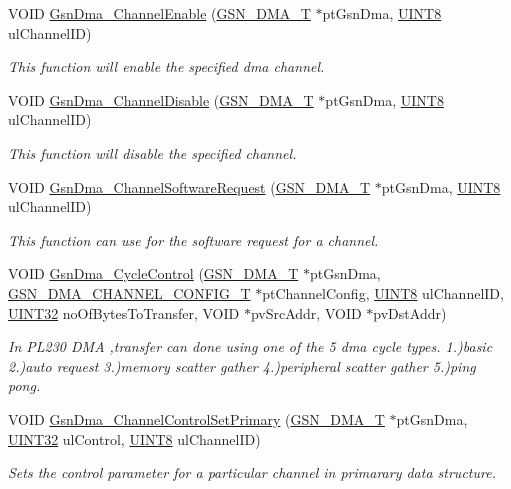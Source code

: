 \begin{DoxyCompactItemize}
VOID \hyperlink{a00645_gafe8f53f9d44f015348fa1dc566a535a9}{GsnDma\_\-ChannelEnable} (\hyperlink{a00049}{GSN\_\-DMA\_\-T} $\ast$ptGsnDma, \hyperlink{a00660_gab27e9918b538ce9d8ca692479b375b6a}{UINT8} ulChannelID)
\begin{DoxyCompactList}\small\item\em This function will enable the specified dma channel. \end{DoxyCompactList}\item 
VOID \hyperlink{a00645_gae368b9082da7ffdcf71880d0ee0d5322}{GsnDma\_\-ChannelDisable} (\hyperlink{a00049}{GSN\_\-DMA\_\-T} $\ast$ptGsnDma, \hyperlink{a00660_gab27e9918b538ce9d8ca692479b375b6a}{UINT8} ulChannelID)
\begin{DoxyCompactList}\small\item\em This function will disable the specified channel. \end{DoxyCompactList}\item 
VOID \hyperlink{a00645_ga4b168b176e39643a79d1e17a35509ddd}{GsnDma\_\-ChannelSoftwareRequest} (\hyperlink{a00049}{GSN\_\-DMA\_\-T} $\ast$ptGsnDma, \hyperlink{a00660_gab27e9918b538ce9d8ca692479b375b6a}{UINT8} ulChannelID)
\begin{DoxyCompactList}\small\item\em This function can use for the software request for a channel. \end{DoxyCompactList}\item 
VOID \hyperlink{a00645_ga508b5fe55e9c637738cf2661a571363c}{GsnDma\_\-CycleControl} (\hyperlink{a00049}{GSN\_\-DMA\_\-T} $\ast$ptGsnDma, \hyperlink{a00052}{GSN\_\-DMA\_\-CHANNEL\_\-CONFIG\_\-T} $\ast$ptChannelConfig, \hyperlink{a00660_gab27e9918b538ce9d8ca692479b375b6a}{UINT8} ulChannelID, \hyperlink{a00660_gae1e6edbbc26d6fbc71a90190d0266018}{UINT32} noOfBytesToTransfer, VOID $\ast$pvSrcAddr, VOID $\ast$pvDstAddr)
\begin{DoxyCompactList}\small\item\em In PL230 DMA ,transfer can done using one of the 5 dma cycle types. 1.)basic 2.)auto request 3.)memory scatter gather 4.)peripheral scatter gather 5.)ping pong. \end{DoxyCompactList}\item 
VOID \hyperlink{a00645_gac94ecec6e71b0486e190f0416ac0aafe}{GsnDma\_\-ChannelControlSetPrimary} (\hyperlink{a00049}{GSN\_\-DMA\_\-T} $\ast$ptGsnDma, \hyperlink{a00660_gae1e6edbbc26d6fbc71a90190d0266018}{UINT32} ulControl, \hyperlink{a00660_gab27e9918b538ce9d8ca692479b375b6a}{UINT8} ulChannelID)
\begin{DoxyCompactList}\small\item\em Sets the control parameter for a particular channel in primarary data structure. \end{DoxyCompactList}\item 

\end{DoxyCompactItemize}
